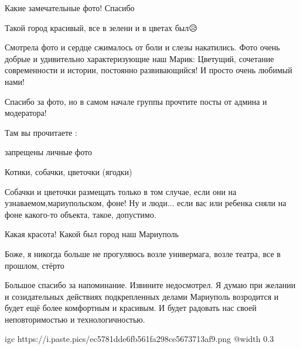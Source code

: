  
 
 
 
 

\qqSecCmt


Какие замечательные фото! Спасибо


Такой город красивый, все в зелени и в цветах был😥



Смотрела фото и сердце сжималось от боли и слезы накатились. Фото очень добрые
и удивительно характеризующие наш Марик: Цветущий, сочетание современности и
истории, постоянно развивающийся! И просто очень любимый нами!


Спасибо за фото, но в самом начале группы прочтите посты от админа и модератора!

Там вы прочитаете :

запрещены личные фото

Котики, собачки, цветочки (ягодки)

Собачки и цветочки размещать только в том случае, если они на узнаваемом,мариупольском, фоне!
Ну и люди... если вас или ребенка сняли на фоне какого-то объекта, такое, допустимо.


Какая красота! Какой был город наш Мариуполь


Боже, я никогда больше не прогуляюсь возле универмага, возле театра, все в
прошлом, стёрто


Большое спасибо за напоминание. Извините недосмотрел. Я думаю при желании и
созидательных действиях подкрепленных делами Мариуполь возродится и будет ещё
более комфортным и красивым. И будет радовать нас своей неповторимостью и
технологичностью.

\ifcmt
  igc https://i.paste.pics/ec5781dde6fb561fa298ce5673713af9.png
  @width 0.3
\fi


